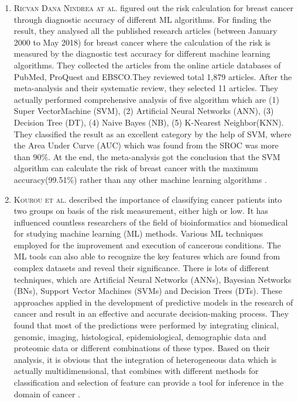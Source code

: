 \begin{enumerate}
  
  \item \textsc{Ricvan Dana Nindrea at al.} figured out the risk calculation for breast cancer through diagnostic accuracy of different ML algorithms. For finding the result,  they analysed all the published research articles (between January 2000 to May 2018) for  breast cancer where the calculation of the risk is measured by the diagnostic test accuracy for different machine learning algorithms. They collected the articles from the online article databases of PubMed, ProQuest and EBSCO.They reviewed total 1,879 articles. After the meta-analysis and their systematic review, they selected 11 articles. They actually performed  comprehensive analysis of five algorithm which are (1) Super VectorMachine (SVM), (2) Artificial Neural Networks (ANN), (3) Decision Tree (DT), (4) Naive Bayes (NB), (5) K-Nearest Neighbor(KNN). They classified the result as an excellent category by the help of SVM, where the Area Under Curve (AUC) which was found from the SROC  was more than 90\%. At the end, the meta-analysis got the conclusion that the SVM algorithm can calculate the risk of  breast cancer with the maximum  accuracy(99.51\%) rather than any other machine learning algorithms \cite{Nindrea2018}.
  
    \item \textsc{Kourou et al.} described the importance of classifying cancer patients into two groups on basis of the risk measurement, either high or low. It has influenced countless researchers of the field of bioinformatics and biomedical for studying machine learning (ML) methods. Various ML techniques employed for the improvement and execution of cancerous conditions. The ML tools can also able to recognize the key features which are found from complex datasets and reveal their significance. There is lots of different techniques, which are Artificial Neural Networks (ANNs), Bayesian Networks (BNs), Support Vector Machines (SVMs)  and Decision Trees (DTs). These approaches applied in the development of predictive models in the research of cancer and result in an effective and accurate decision-making process. They found that most of the predictions were performed by integrating clinical, genomic, imaging,  histological, epidemiological, demographic data and proteomic data or different combinations of these types. Based on their analysis, it is obvious that the integration of heterogeneous data which is actually multidimensional, that combines with different methods for classification and selection of feature can provide a tool for inference in the domain of cancer \cite{KOUROU20158}.
    

\end{enumerate}
